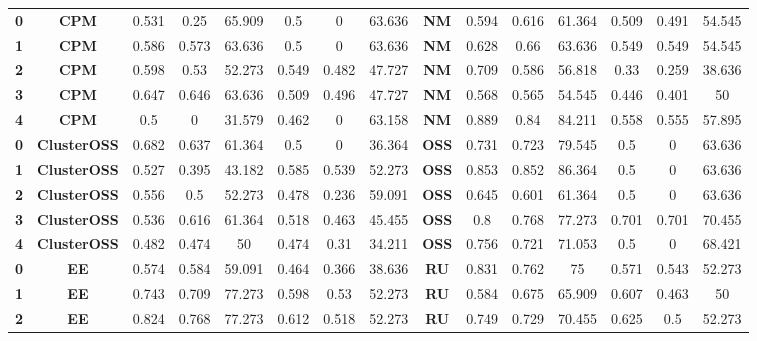 {{\begin{tabular}{c|c|cccccc|ccccccc}
\textbf{0} & \textbf{CPM} & 0.531 & 0.25  & 65.909 & 0.5   & 0     & 63.636 & \multicolumn{1}{c|}{\textbf{NM}} & 0.594 & 0.616 & 61.364 & 0.509 & 0.491 & 54.545 \\
\textbf{1} & \textbf{CPM} & 0.586 & 0.573 & 63.636 & 0.5   & 0     & 63.636 & \multicolumn{1}{c|}{\textbf{NM}} & 0.628 & 0.66  & 63.636 & 0.549 & 0.549 & 54.545 \\
\textbf{2} & \textbf{CPM} & 0.598 & 0.53  & 52.273 & 0.549 & 0.482 & 47.727 & \multicolumn{1}{c|}{\textbf{NM}} & 0.709 & 0.586 & 56.818 & 0.33  & 0.259 & 38.636 \\
\textbf{3} & \textbf{CPM} & 0.647 & 0.646 & 63.636 & 0.509 & 0.496 & 47.727 & \multicolumn{1}{c|}{\textbf{NM}} & 0.568 & 0.565 & 54.545 & 0.446 & 0.401 & 50 \\
\textbf{4} & \textbf{CPM} & 0.5   & 0     & 31.579 & 0.462 & 0     & 63.158 & \multicolumn{1}{c|}{\textbf{NM}} & 0.889 & 0.84  & 84.211 & 0.558 & 0.555 & 57.895 \\
\textbf{0} & \textbf{ClusterOSS} & 0.682 & 0.637 & 61.364 & 0.5   & 0     & 36.364 & \multicolumn{1}{c|}{\textbf{OSS}} & 0.731 & 0.723 & 79.545 & 0.5   & 0     & 63.636 \\
\textbf{1} & \textbf{ClusterOSS} & 0.527 & 0.395 & 43.182 & 0.585 & 0.539 & 52.273 & \multicolumn{1}{c|}{\textbf{OSS}} & 0.853 & 0.852 & 86.364 & 0.5   & 0     & 63.636 \\
\textbf{2} & \textbf{ClusterOSS} & 0.556 & 0.5   & 52.273 & 0.478 & 0.236 & 59.091 & \multicolumn{1}{c|}{\textbf{OSS}} & 0.645 & 0.601 & 61.364 & 0.5   & 0     & 63.636 \\
\textbf{3} & \textbf{ClusterOSS} & 0.536 & 0.616 & 61.364 & 0.518 & 0.463 & 45.455 & \multicolumn{1}{c|}{\textbf{OSS}} & 0.8   & 0.768 & 77.273 & 0.701 & 0.701 & 70.455 \\
\textbf{4} & \textbf{ClusterOSS} & 0.482 & 0.474 & 50    & 0.474 & 0.31  & 34.211 & \multicolumn{1}{c|}{\textbf{OSS}} & 0.756 & 0.721 & 71.053 & 0.5   & 0     & 68.421 \\
\textbf{0} & \textbf{EE} & 0.574 & 0.584 & 59.091 & 0.464 & 0.366 & 38.636 & \multicolumn{1}{c|}{\textbf{RU}} & 0.831 & 0.762 & 75    & 0.571 & 0.543 & 52.273 \\
\textbf{1} & \textbf{EE} & 0.743 & 0.709 & 77.273 & 0.598 & 0.53  & 52.273 & \multicolumn{1}{c|}{\textbf{RU}} & 0.584 & 0.675 & 65.909 & 0.607 & 0.463 & 50 \\
\textbf{2} & \textbf{EE} & 0.824 & 0.768 & 77.273 & 0.612 & 0.518 & 52.273 & \multicolumn{1}{c|}{\textbf{RU}} & 0.749 & 0.729 & 70.455 & 0.625 & 0.5   & 52.273 \\

\end{tabular}}}
